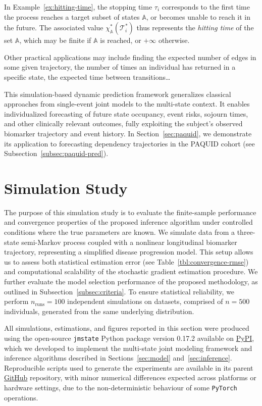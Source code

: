 \documentclass{sn-jnl}
\begin{document}
In Example~\ref{ex:hitting-time}, the stopping time $\tau_i$ corresponds to the first time the process reaches a target subset of states $\mathbb{A}$, or becomes unable to reach it in the future.
The associated value $\chi_{\mathbb{A}}^*(\mathcal{T}_i^*)$ thus represents the \emph{hitting time} of the set $\mathbb{A}$, which may be finite if $\mathbb{A}$ is reached, or $+\infty$ otherwise.

\bigbreak

Other practical applications may include finding the expected number of edges in some given trajectory, the number of times an individual has returned in a specific state, the expected time between transitions\dots

This simulation-based dynamic prediction framework generalizes classical approaches from single-event joint models to the multi-state context. It enables individualized forecasting of future state occupancy, event risks, sojourn times, and other clinically relevant outcomes, fully exploiting the subject's observed biomarker trajectory and event history. In Section~\ref{sec:paquid}, we demonstrate its application to forecasting dependency trajectories in the PAQUID cohort (see Subsection~\ref{subsec:paquid-pred}).

\section{Simulation Study} \label{sec:experiments}

The purpose of this simulation study is to evaluate the finite-sample performance and convergence properties of the proposed inference algorithm under controlled conditions where the true parameters are known. We simulate data from a three-state semi-Markov process coupled with a nonlinear longitudinal biomarker trajectory, representing a simplified disease progression model. This setup allows us to assess both statistical estimation error (see Table~\ref{tbl:convergence-rmse}) and computational scalability of the stochastic gradient estimation procedure. We further evaluate the model selection performance of the proposed methodology, as outlined in Subsection~\ref{subsec:criteria}. To ensure statistical reliability, we perform $n_\mathrm{runs} = 100$ independent simulations on datasets, comprised of $n = 500$ individuals, generated from the same underlying distribution.

All simulations, estimations, and figures reported in this section were produced using the open-source \texttt{jmstate} Python package version 0.17.2 available on \href{https://pypi.org/project/jmstate/}{PyPI}, which we developed to implement the multi-state joint modeling framework and inference algorithms described in Sections~\ref{sec:model} and~\ref{sec:inference}. Reproducible scripts used to generate the experiments are available in its parent \href{https://github.com/felixlaplante0/jmstate}{GitHub} repository, with minor numerical differences expected across platforms or hardware settings, due to the non-deterministic behaviour of some \texttt{PyTorch} operations.
\end{document}
